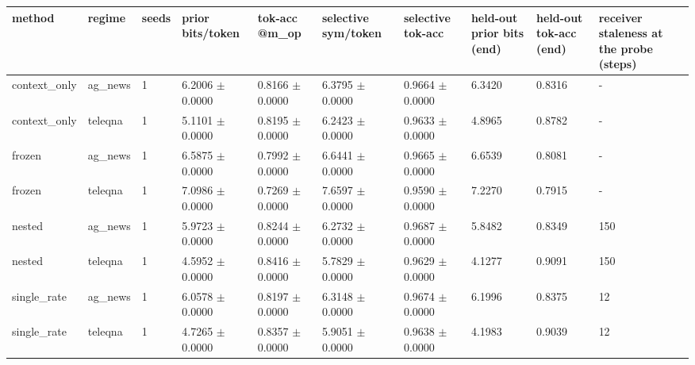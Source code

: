 \begin{tabular}{llllllllll}
\hline
method & regime & seeds & prior bits/token & tok-acc @m\_op & selective sym/token & selective tok-acc & held-out prior bits (end) & held-out tok-acc (end) & receiver staleness at the probe (steps) \\
\hline
context\_only & ag\_news & 1 & 6.2006 $\pm$ 0.0000 & 0.8166 $\pm$ 0.0000 & 6.3795 $\pm$ 0.0000 & 0.9664 $\pm$ 0.0000 & 6.3420 & 0.8316 & - \\
context\_only & teleqna & 1 & 5.1101 $\pm$ 0.0000 & 0.8195 $\pm$ 0.0000 & 6.2423 $\pm$ 0.0000 & 0.9633 $\pm$ 0.0000 & 4.8965 & 0.8782 & - \\
frozen & ag\_news & 1 & 6.5875 $\pm$ 0.0000 & 0.7992 $\pm$ 0.0000 & 6.6441 $\pm$ 0.0000 & 0.9665 $\pm$ 0.0000 & 6.6539 & 0.8081 & - \\
frozen & teleqna & 1 & 7.0986 $\pm$ 0.0000 & 0.7269 $\pm$ 0.0000 & 7.6597 $\pm$ 0.0000 & 0.9590 $\pm$ 0.0000 & 7.2270 & 0.7915 & - \\
nested & ag\_news & 1 & 5.9723 $\pm$ 0.0000 & 0.8244 $\pm$ 0.0000 & 6.2732 $\pm$ 0.0000 & 0.9687 $\pm$ 0.0000 & 5.8482 & 0.8349 & 150 \\
nested & teleqna & 1 & 4.5952 $\pm$ 0.0000 & 0.8416 $\pm$ 0.0000 & 5.7829 $\pm$ 0.0000 & 0.9629 $\pm$ 0.0000 & 4.1277 & 0.9091 & 150 \\
single\_rate & ag\_news & 1 & 6.0578 $\pm$ 0.0000 & 0.8197 $\pm$ 0.0000 & 6.3148 $\pm$ 0.0000 & 0.9674 $\pm$ 0.0000 & 6.1996 & 0.8375 & 12 \\
single\_rate & teleqna & 1 & 4.7265 $\pm$ 0.0000 & 0.8357 $\pm$ 0.0000 & 5.9051 $\pm$ 0.0000 & 0.9638 $\pm$ 0.0000 & 4.1983 & 0.9039 & 12 \\
\hline
\end{tabular}
